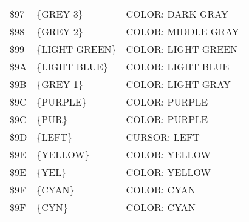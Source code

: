 \documentclass{article}
\begin{document}
\begin{longtable}[l]{l l l}
        \$97 & \{GREY 3\} & COLOR: DARK GRAY\\
        \$98 & \{GREY 2\} & COLOR: MIDDLE GRAY\\
        \$99 & \{LIGHT GREEN\} & COLOR: LIGHT GREEN\\
        \$9A & \{LIGHT BLUE\} & COLOR: LIGHT BLUE\\
        \$9B & \{GREY 1\} & COLOR: LIGHT GRAY\\
        \$9C & \{PURPLE\} & COLOR: PURPLE\\
        \$9C & \{PUR\} & COLOR: PURPLE\\
        \$9D & \{LEFT\} & CURSOR: LEFT\\
        \$9E & \{YELLOW\} & COLOR: YELLOW\\
        \$9E & \{YEL\} & COLOR: YELLOW\\
        \$9F & \{CYAN\} & COLOR: CYAN\\
        \$9F & \{CYN\} & COLOR: CYAN\\
    \end{longtable}
\end{document}
